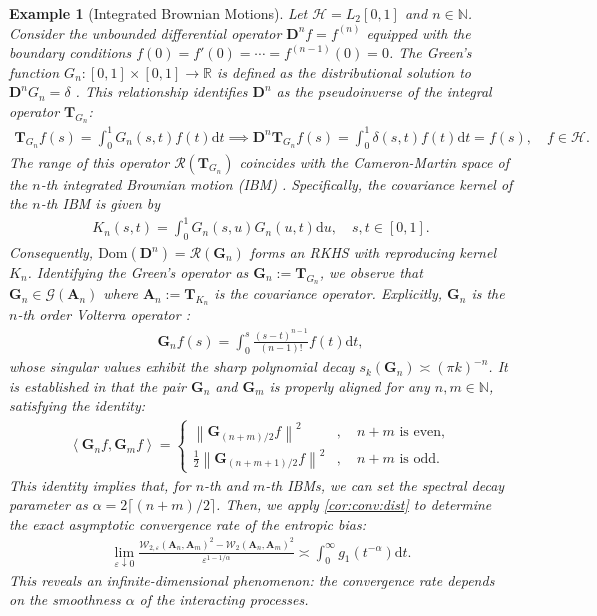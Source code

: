 \documentclass[noinfoline]{imsart}\setcounter{tocdepth}{2}
\renewcommand{\b}[1]{\mathbb{#1}}
\newcommand{\m}[1]{\mathbf{#1}}
\renewcommand{\c}[1]{\mathcal{#1}}
\newcommand{\innpr}[2]{{\left\langle {#1},{#2}\right\rangle}}
\newcommand{\rd}{\mathrm{d}}
\theoremstyle{plain}
\newtheorem{example}{Example}[section]
\begin{document}
\begin{example}[Integrated Brownian Motions]
Let $\c{H} = L_{2}[0,1]$ and $n \in \b{N}$. Consider the unbounded differential operator $\m{D}^{n} f = f^{(n)}$ equipped with the boundary conditions $f(0) = f'(0) = \cdots = f^{(n-1)}(0) = 0$. The Green's function $G_{n}: [0, 1] \times [0, 1] \to \b{R}$ is defined as the distributional solution to $\m{D}^{n} G_{n} = \delta$ \cite{hall2013quantum, conway2019course}. This relationship identifies $\m{D}^{n}$ as the pseudoinverse of the integral operator $\m{T}_{G_{n}}$:
\begin{align*}
    \m{T}_{G_{n}} f(s) = \int_{0}^{1} G_{n}(s, t) f(t) \rd t \implies \m{D}^{n} \m{T}_{G_{n}} f(s)= \int_{0}^{1} \delta(s, t) f(t) \rd t = f(s), \quad f \in \c{H}.
\end{align*}
The range of this operator $\c{R}(\m{T}_{G_{n}})$ coincides with the Cameron-Martin space of the $n$-th integrated Brownian motion (IBM) \cite{da2006introduction, hairer2009introduction}. Specifically, the covariance kernel of the $n$-th IBM is given by
\begin{align*}
    K_{n}(s, t) = \int_{0}^{1} G_{n}(s, u) G_{n}(u, t) \rd u, \quad s, t \in [0, 1].
\end{align*}
Consequently, $\text{Dom}(\m{D}^{n}) = \c{R}(\m{G}_{n})$ forms an RKHS with reproducing kernel $K_{n}$. Identifying the Green's operator as $\m{G}_{n} := \m{T}_{G_{n}}$, we observe that $\m{G}_{n} \in \c{G}(\m{A}_{n})$ where $\m{A}_{n} := \m{T}_{K_{n}}$ is the covariance operator. Explicitly, $\m{G}_{n}$ is the $n$-th order Volterra operator \cite{gohberg1978introduction, paulsen2016introduction}:
\begin{align*}
    \m{G}_{n} f (s) = \int_{0}^{s} \frac{(s-t)^{n-1}}{(n-1)!} f(t) \rd t,
\end{align*}
whose singular values exhibit the sharp polynomial decay $s_{k}(\m{G}_{n}) \asymp (\pi k)^{-n}$.
It is established in \cite{yun2025gaussian} that the pair $\m{G}_{n}$ and $\m{G}_{m}$ is properly aligned for any $n, m \in \b{N}$, satisfying the identity:
\begin{align*}
    \innpr{\m{G}_{n} f}{\m{G}_{m} f} = 
    \begin{cases}
        \left\| \m{G}_{(n+m)/2} f \right\|^{2} &, \quad n+m \text{ is even}, \\
        \frac{1}{2} \left\| \m{G}_{(n+m+1)/2} f \right\|^{2} &, \quad n+m \text{ is odd}.
    \end{cases}
\end{align*}
This identity implies that, for $n$-th and $m$-th IBMs, we can set the spectral decay parameter as $\alpha = 2 \lceil (n+m)/2 \rceil$. Then, we apply \cref{cor:conv:dist} to determine the exact asymptotic convergence rate of the entropic bias:
\begin{align*}
    \lim_{\varepsilon \downarrow 0} \frac{\c{W}_{2, \varepsilon} (\m{A}_{n}, \m{A}_{m})^{2} - \c{W}_{2} (\m{A}_{n}, \m{A}_{m})^{2}}{\varepsilon^{1-1/\alpha}} \asymp \int_{0}^{\infty} g_{1} (t^{-\alpha}) \rd t.
\end{align*}
This reveals an infinite-dimensional phenomenon: the convergence rate depends on the smoothness $\alpha$ of the interacting processes.
\end{example}
\end{document}
